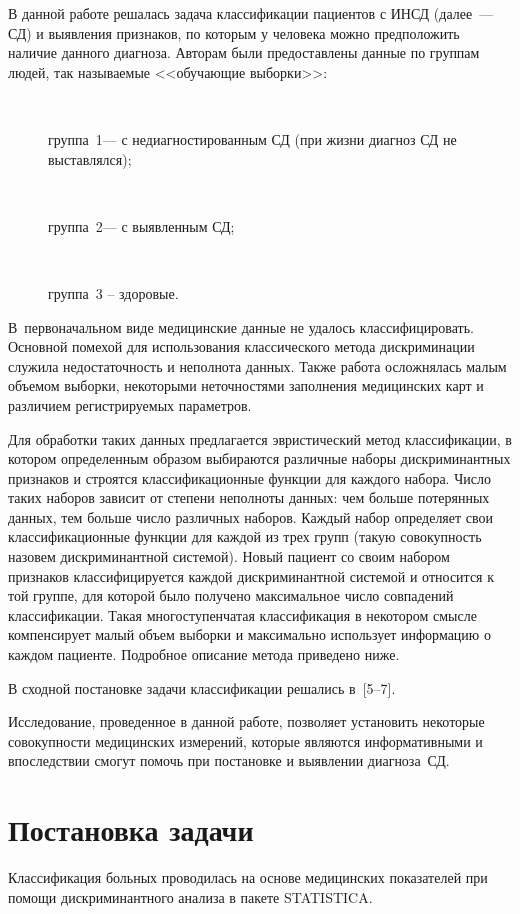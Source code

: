 \begin{multicols}{2}
В данной работе решалась задача классификации пациентов с
ИНСД (далее~--- СД) и выявления
признаков, по которым у человека можно предположить наличие данного
диагноза. Авторам были предоставлены данные по группам людей, так
называемые <<обучающие выборки>>: 
\begin{description}
\item[\,] группа~1--- с недиагностированным
СД (при жизни диагноз СД не выставлялся); 
\item[\,] группа~2--- с выявленным СД; 
\item[\,] группа~3 -- здоровые.
\end{description}
 В~первоначальном виде медицинские данные
не удалось классифицировать. Основной помехой для использования
классического метода дискриминации служила недостаточность и
неполнота данных. Также работа осложнялась малым объемом выборки,
некоторыми неточностями заполнения медицинских карт и различием
регистрируемых па\-ра\-мет\-ров.

Для обработки таких данных предлагается эвристический метод
классификации, в котором определенным образом выбираются различные
наборы дискриминантных признаков и строятся классификационные
функции для каждого набора. Чис\-ло таких наборов зависит от степени
неполноты данных: чем больше потерянных данных, тем больше чис\-ло
различных наборов. Каждый набор определяет свои классификационные
функции для каж\-дой из трех групп (такую совокупность назовем
дискриминантной сис\-те\-мой). Новый пациент со своим набором признаков
классифицируется каж\-дой дискриминантной системой и относится к той
группе, для которой было получено максимальное число совпаде\-ний
классификации.  Такая многоступенчатая классификация в некотором
смысле компенсирует малый объем выборки и максимально использует
информацию о каждом пациенте. Подробное описание метода приведено ниже.

В сходной постановке задачи классификации решались в~[5--7]. %

Исследование, проведенное в данной работе, позволяет установить
некоторые совокупности медицинских измерений, которые являются
информативными и впоследствии смогут помочь при постановке и
выявлении диагноза~СД.

\section{Постановка задачи}

Классификация больных проводилась на основе медицинских
показателей при помощи диск\-ри\-ми\-нант\-но\-го анализа в пакете STATISTICA.


\end{multicols}
